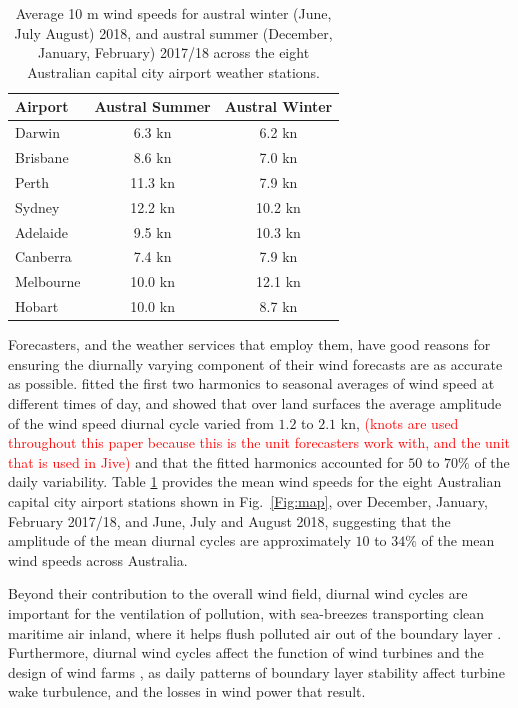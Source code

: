 \documentclass{ametsoc}
\begin{document}
\begin{table}
\begin{center}
\begin{tabular}{l |c|c}
Airport & Austral Summer & Austral Winter \\
\hline
Darwin  & 6.3 kn& 6.2 kn \\
Brisbane  & 8.6 kn& 7.0 kn \\
Perth  & 11.3 kn& 7.9 kn \\
Sydney  & 12.2 kn & 10.2 kn \\
Adelaide  & 9.5 kn & 10.3 kn \\
Canberra  & 7.4 kn & 7.9 kn \\
Melbourne  & 10.0 kn & 12.1 kn \\
Hobart & 10.0 kn & 8.7 kn
\end{tabular}
\caption{Average 10 m wind speeds for austral winter (June, July August) 2018, and austral summer (December, January, February) 2017/18 across the eight Australian capital city airport weather stations.}
\label{Tab:Speeds}
\end{center}
\end{table}

Forecasters, and the weather services that employ them, have good reasons for ensuring the diurnally varying component of their wind forecasts are as accurate as possible. \citet{dai99} fitted the first two harmonics to seasonal averages of wind speed at different times of day, and showed that over land surfaces the average amplitude of the wind speed diurnal cycle varied from $1.2$ to $2.1$ kn, \textcolor{red}{(knots are used throughout this paper because this is the unit forecasters work with, and the unit that is used in Jive)} and that the fitted harmonics accounted for $50$ to $70\%$ of the daily variability. Table \ref{Tab:Speeds} provides the mean wind speeds for the eight Australian capital city airport stations shown in Fig.~\ref{Fig:map}, over December, January, February 2017/18, and June, July and August 2018, suggesting that the amplitude of the mean diurnal cycles are approximately $10$ to $34\%$ of the mean wind speeds across Australia. 

Beyond their contribution to the overall wind field, diurnal wind cycles are important for the ventilation of pollution, with sea-breezes transporting clean maritime air inland, where it helps flush polluted air out of the boundary layer \citep{miller03, physick92}. Furthermore, diurnal wind cycles affect the function of wind turbines \citep{englberger18} and the design of wind farms \citep{abkar16}, as daily patterns of boundary layer stability affect turbine wake turbulence, and the losses in wind power that result. 
\end{document}
